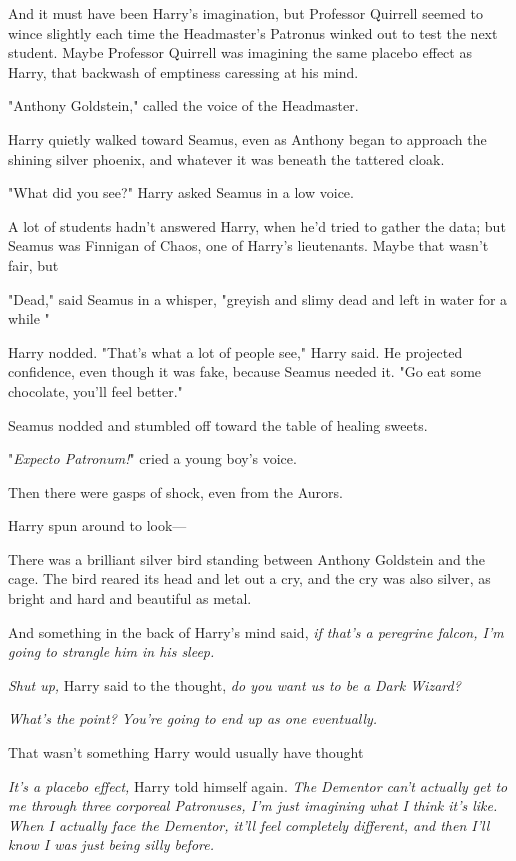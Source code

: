 And it must have been Harry's imagination, but Professor Quirrell seemed to
wince slightly each time the Headmaster's Patronus winked out to test the next
student. Maybe Professor Quirrell was imagining the same placebo effect as
Harry, that backwash of emptiness caressing at his mind.

"Anthony Goldstein," called the voice of the Headmaster.

Harry quietly walked toward Seamus, even as Anthony began to approach the
shining silver phoenix, and{\el} whatever it was beneath the tattered cloak.

"What did you see?" Harry asked Seamus in a low voice.

A lot of students hadn't answered Harry, when he'd tried to gather the data;
but Seamus was Finnigan of Chaos, one of Harry's lieutenants. Maybe that wasn't
fair, but{\el}

"Dead," said Seamus in a whisper, "greyish and slimy{\el} dead and left in
water for a while{\el} "

Harry nodded. "That's what a lot of people see," Harry said. He projected
confidence, even though it was fake, because Seamus needed it. "Go eat some
chocolate, you'll feel better."

Seamus nodded and stumbled off toward the table of healing sweets.

"\emph{Expecto Patronum!}" cried a young boy's voice.

Then there were gasps of shock, even from the Aurors.

Harry spun around to look---

There was a brilliant silver bird standing between Anthony Goldstein and the
cage. The bird reared its head and let out a cry, and the cry was also silver,
as bright and hard and beautiful as metal.

And something in the back of Harry's mind said, \emph{if that's a peregrine
falcon, I'm going to strangle him in his sleep.}

\emph{Shut up,} Harry said to the thought, \emph{do you want us to be a Dark
Wizard?}

\emph{What's the point? You're going to end up as one eventually.}

That{\el} wasn't something Harry would usually have thought{\el}

\emph{It's a placebo effect,} Harry told himself again. \emph{The Dementor
can't actually get to me through three corporeal Patronuses, I'm just imagining
what I think it's like. When I actually face the Dementor, it'll feel
completely different, and then I'll know I was just being silly before.}

